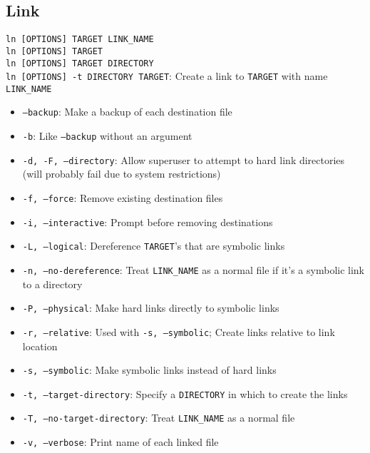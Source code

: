 \documentclass[13pt]{article}
\begin{document}
\subsection{Link}
\texttt{ln [OPTIONS] TARGET LINK\_NAME} \\
\texttt{ln [OPTIONS] TARGET} \\
\texttt{ln [OPTIONS] TARGET DIRECTORY} \\
\texttt{ln [OPTIONS] -t DIRECTORY TARGET}: Create a link to \texttt{TARGET} with name \texttt{LINK\_NAME}
\begin{itemize}[leftmargin = 0pt]
\item [] \texttt{--backup}: Make a backup of each destination file
\item [] \texttt{-b}: Like \texttt{--backup} without an argument
\item [] \texttt{-d, -F, --directory}: Allow superuser to attempt to hard link directories (will probably fail due to system restrictions)
\item [] \texttt{-f, --force}: Remove existing destination files
\item [] \texttt{-i, --interactive}: Prompt before removing destinations
\item [] \texttt{-L, --logical}: Dereference \texttt{TARGET}'s that are symbolic links
\item [] \texttt{-n, --no-dereference}: Treat \texttt{LINK\_NAME} as a normal file if it's a symbolic link to a directory
\item [] \texttt{-P, --physical}: Make hard links directly to symbolic links
\item [] \texttt{-r, --relative}: Used with \texttt{-s, --symbolic}; Create links relative to link location
\item [] \texttt{-s, --symbolic}: Make symbolic links instead of hard links
\item [] \texttt{-t, --target-directory}: Specify a \texttt{DIRECTORY} in which to create the links
\item [] \texttt{-T, --no-target-directory}: Treat \texttt{LINK\_NAME} as a normal file
\item [] \texttt{-v, --verbose}: Print name of each linked file
\end{itemize}
\end{document}
